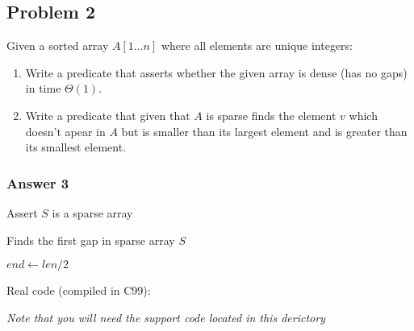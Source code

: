 \documentclass[11pt]{article}
\begin{document}
\subsection{Problem 2}
\label{sec:orgheadline5}
Given a sorted array \(A[1\dots n]\) where all elements are unique integers:
\begin{enumerate}
\item Write a predicate that asserts whether the given array is dense
(has no gaps) in time \(\Theta(1)\).
\item Write a predicate that given that \(A\) is sparse finds the element \(v\)
which doesn't apear in \(A\) but is smaller than its largest element
and is greater than its smallest element.
\end{enumerate}

\subsubsection{Answer 3}
\label{sec:orgheadline4}
\begin{algorithm}
  \caption{Assert $S$ is a sparse array}
  \begin{algorithmic}
    \State {}
    \State {}
    \State {}
    \State {}
    \EndProcedure
  \end{algorithmic}
\end{algorithm}

\begin{algorithm}
  \caption{Finds the first gap in sparse array $S$}
  \begin{algorithmic}
    \State {}
     {$end \leftarrow len / 2$}
    \State {}
     \Then
    \Else
    \EndIf
    \EndWhile
    \State {}
    \EndProcedure
  \end{algorithmic}
\end{algorithm}

Real code (compiled in C99):

\emph{Note that you will need the support code located in this derictory}
\end{document}
